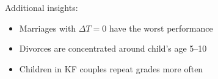 \documentclass[landscape,a0paper,fontscale=0.285]{baposter} %
\begin{document}
\begin{poster}
{	
Additional insights:
	\begin{itemize}
	\item Marriages with $\Delta T = 0$ have the worst performance
	\item Divorces are concentrated around child's age 5--10
	\item Children in KF couples repeat grades more often
	\vspace{2em}
	\end{itemize}
	}
%


\end{poster}
\end{document}

